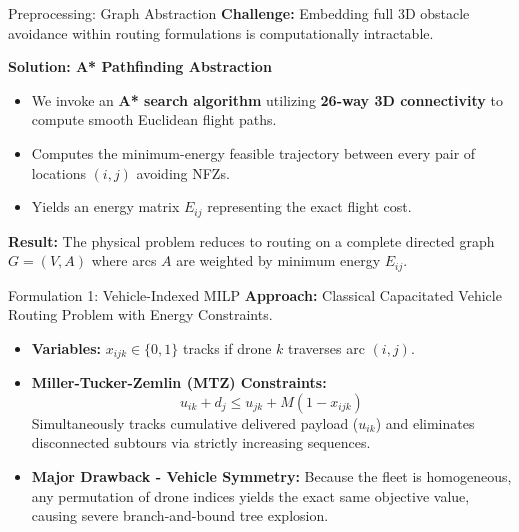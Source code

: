 \documentclass[11pt,aspectratio=169]{beamer}
\begin{document}
\begin{frame}{Preprocessing: Graph Abstraction}
    \textbf{Challenge:} Embedding full 3D obstacle avoidance within routing formulations is computationally intractable.
    
    \vspace{0.3cm}
    \textbf{Solution: A* Pathfinding Abstraction}
    \begin{itemize}
        \item We invoke an \textbf{A* search algorithm} utilizing \textbf{26-way 3D connectivity} to compute smooth Euclidean flight paths.
        \item Computes the minimum-energy feasible trajectory between every pair of locations $(i, j)$ avoiding NFZs.
        \item Yields an energy matrix $E_{ij}$ representing the exact flight cost.
    \end{itemize}
    
    \vspace{0.3cm}
    \textbf{Result:} The physical problem reduces to routing on a complete directed graph $G = (V, A)$ where arcs $A$ are weighted by minimum energy $E_{ij}$.
\end{frame}

\begin{frame}{Formulation 1: Vehicle-Indexed MILP}
    \textbf{Approach:} Classical Capacitated Vehicle Routing Problem with Energy Constraints.
    
    \begin{itemize}
        \item \textbf{Variables:} $x_{ijk} \in \{0, 1\}$ tracks if drone $k$ traverses arc $(i,j)$.
        \item \textbf{Miller-Tucker-Zemlin (MTZ) Constraints:}
        \begin{equation*}
            u_{ik} + d_j \le u_{jk} + M(1 - x_{ijk})
        \end{equation*}
        Simultaneously tracks cumulative delivered payload ($u_{ik}$) and eliminates disconnected subtours via strictly increasing sequences.
        \vspace{0.3cm}
        \item \textbf{Major Drawback - Vehicle Symmetry:} 
        Because the fleet is homogeneous, any permutation of drone indices yields the exact same objective value, causing severe branch-and-bound tree explosion.
    \end{itemize}
\end{frame}
\end{document}
